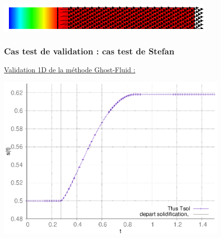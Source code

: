 \documentclass{beamer}
\begin{document}
\begin{frame}
\begin{columns}
\begin{column}{0.5 \textwidth}
   \end{column}
   \end{columns}

\center \includegraphics[width=0.8\textwidth]{Figures/avantApresRhoDiff0000.png}
\end{frame}
\begin{frame}
    \frametitle{Cas test de validation : cas test de Stefan}
	\scriptsize
	\color{cea_rouge}\underline{Validation 1D de la méthode Ghost-Fluid :}\color{cea_texte}\\
	\begin{center}

\includegraphics[width=0.85\textwidth]{Figures/StefanTFusTSol.eps}
\end{center}
	\end{frame}
\end{document}
